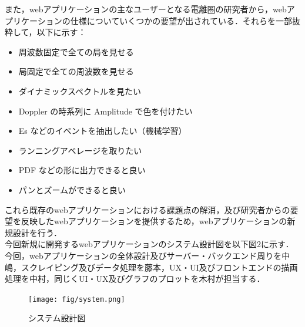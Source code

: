 また，webアプリケーションの主なユーザーとなる電離圏の研究者から，webアプリケーションの仕様についていくつかの要望が出されている．それらを一部抜粋して，以下に示す：
\begin{itemize}
\item 周波数固定で全ての局を見せる
\item 局固定で全ての周波数を見せる
\item ダイナミックスペクトルを見たい
\item Doppler の時系列に Amplitude で色を付けたい
\item Es などのイベントを抽出したい（機械学習）
\item ランニングアベレージを取りたい
\item PDF などの形に出力できると良い
\item パンとズームができると良い
\end{itemize}

これら既存のwebアプリケーションにおける課題点の解消，及び研究者からの要望を反映したwebアプリケーションを提供するため，webアプリケーションの新規設計を行う．\\
今回新規に開発するwebアプリケーションのシステム設計図を以下図2に示す．\\
今回，webアプリケーションの全体設計及びサーバー・バックエンド周りを中嶋，スクレイピング及びデータ処理を藤本，UX・UI及びフロントエンドの描画処理を中村，同じくUI・UX及びグラフのプロットを木村が担当する．
\begin{figure}[ht]
  \centering
  \texttt{[image: fig/system.png]}
    \caption{システム設計図}
\end{figure}

